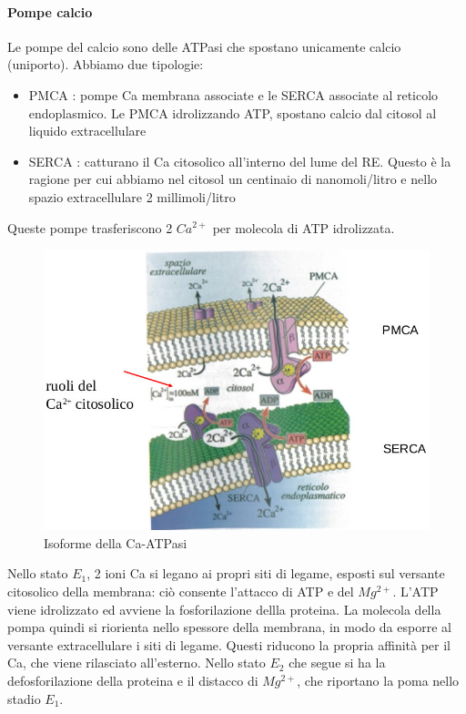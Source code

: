 \documentclass[a4paper,12pt]{article}
\begin{document}
\paragraph{Pompe calcio}
Le pompe del calcio sono delle ATPasi che spostano
unicamente calcio (uniporto). Abbiamo due tipologie: 
\begin{itemize}
\item{PMCA : pompe Ca membrana associate e le SERCA associate al reticolo endoplasmico.
Le PMCA idrolizzando ATP, spostano calcio dal citosol
al liquido extracellulare}
\item{SERCA : catturano il Ca citosolico all’interno del lume del RE. Questo è la ragione per cui abbiamo nel citosol un centinaio di nanomoli/litro e nello spazio extracellulare 2 millimoli/litro}
\end{itemize}
Queste pompe trasferiscono 2 $Ca^{2+}$ per molecola di ATP idrolizzata.
\begin{figure}[H]
\centering
\includegraphics[scale=0.4]{immagine/pompa_ca.jpg}
\caption{Isoforme della Ca-ATPasi}
\end{figure}

Nello stato $E_{1}$, 2 ioni Ca si legano ai propri siti di legame, esposti sul versante citosolico della membrana: ciò consente l'attacco di ATP e del $Mg^{2+}$. L'ATP viene idrolizzato ed avviene la fosforilazione dellla proteina. La molecola della pompa quindi si riorienta nello spessore della membrana, in modo da esporre al versante extracellulare i siti di legame. Questi riducono la propria affinità per il Ca, che viene rilasciato all'esterno. Nello stato $E_{2}$ che segue si ha la defosforilazione della proteina e il distacco di $Mg^{2+}$, che riportano la poma nello stadio $E_{1}$.
\end{document}
